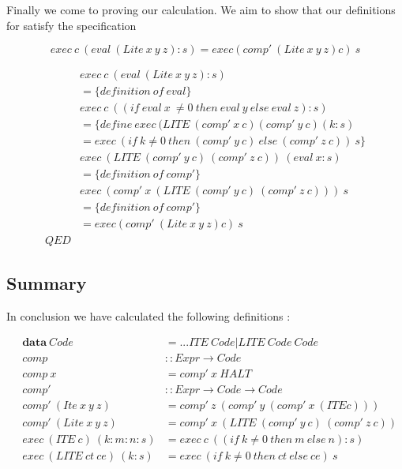 \documentclass {article}
\begin{document}
Finally we come to proving our calculation.
We aim to show that our definitions for \lite
satisfy the specification

	\[ exec \ c \ (eval \ (Lite \ x \ y \ z):s) = exec (comp' \ (Lite \ x \ y \ z) c)  \ s  \]

\begin{align*}
	&exec \ c \ (eval \ (Lite \ x \ y \ z):s) \\
	&= \{ definition \ of \ eval \} \\
	&exec \ c \ ((if \ eval \ x \ \not= 0 \ then \ eval \ y \ else \ eval \ z) :s) \\
	&= \{ define\: exec \ (LITE \ (comp' \ x \ c) (comp' \ y \ c) (k : s) \\
	&= exec \ (if \ k \not=0 \ then \ (comp' \ y \ c) \ else \ (comp' \ z \ c)) \ s \} \\
	& exec \ (LITE \ (comp' \ y \ c) \ (comp' \ z \ c)) \ (eval \ x : s) \\
	&= \{ definition \ of \ comp' \} \\
	& exec \ (comp' \ x \ (LITE \ 
							(comp' \ y \ c) \ 
							(comp' \ z \ c))) \ s \\
	&= \{definition \ of \ comp' \} \\
	&= exec (comp' \ (Lite \ x \ y \ z) c)  \ s \\
	QED
\end{align*}

\subsection{Summary}

In conclusion we have calculated the following definitions
												\cite[page 11]{bandh}:

\begin{eqnarray*}
	&\textbf{data} \ Code &= ...ITE\ Code | LITE\ Code\ Code \\
	&comp 				  &:: Expr \rightarrow Code \\
	&comp\ x			  &= comp'\ x\ HALT \\
	&comp'				  &:: Expr \rightarrow Code \rightarrow Code \\
	&comp'\ (Ite\ x\ y\ z) 
				&= comp'\ z\ (comp' \ y\ (comp' \ x\ (ITE c))) \\
	&comp'\ (Lite\ x\ y\ z) 
				&= comp'\ x\ (LITE\ (comp'\ y\ c)\ (comp'\ z\ c)) \\
	&exec\ (ITE\ c)\ (k:m:n:s) 
						&= exec\ c\ ((if\ k \not=0\ then\ m\ else\ n):s) \\
	&exec\ (LITE\ ct\ ce)\ (k:s) 
						&= exec\ (if\ k \not=0\ then\ ct\ else\ ce)\ s
\end{eqnarray*}
\end{document}
